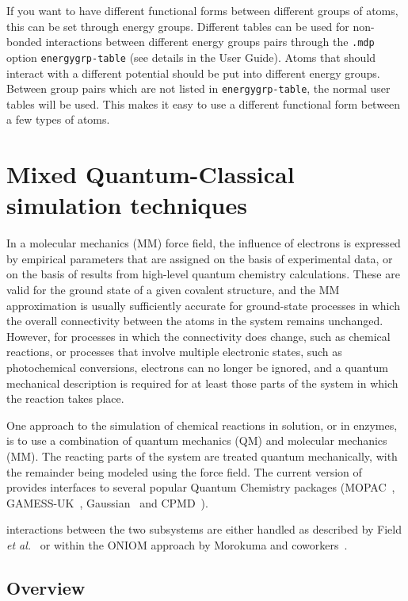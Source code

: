 If you want to have different functional forms between different
groups of atoms, this can be set through energy groups.
Different tables can be used for non-bonded interactions between
different energy groups pairs through the {\tt .mdp} option {\tt energygrp-table}
(see details in the User Guide).
Atoms that should interact with a different potential should
be put into different energy groups.
Between group pairs which are not listed in {\tt energygrp-table},
the normal user tables will be used. This makes it easy to use
a different functional form between a few types of atoms.

\section{Mixed Quantum-Classical simulation techniques}

In a molecular mechanics (MM) force field, the influence of electrons
is expressed by empirical parameters that are assigned on the basis of
experimental data, or on the basis of results from high-level quantum
chemistry calculations. These are valid for the ground state of a
given covalent structure, and the MM approximation is usually
sufficiently accurate for ground-state processes in which the overall
connectivity between the atoms in the system remains
unchanged. However, for processes in which the connectivity does
change, such as chemical reactions, or processes that involve multiple
electronic states, such as photochemical conversions, electrons can no
longer be ignored, and a quantum mechanical description is required
for at least those parts of the system in which the reaction takes
place.

One approach to the simulation of chemical reactions in solution, or
in enzymes, is to use a combination of quantum mechanics (QM) and
molecular mechanics (MM). The reacting parts of the system are treated
quantum mechanically, with the remainder being modeled using the
force field. The current version of {\gromacs} provides interfaces to
several popular Quantum Chemistry packages (MOPAC~\cite{mopac},
GAMESS-UK~\cite{gamess-uk}, Gaussian~\cite{g03} and CPMD~\cite{Car85a}).

{\gromacs} interactions between the two subsystems are
either handled as described by Field {\em et al.}~\cite{Field90a} or
within the ONIOM approach by Morokuma and coworkers~\cite{Maseras96a,
Svensson96a}.

\subsection{Overview}


